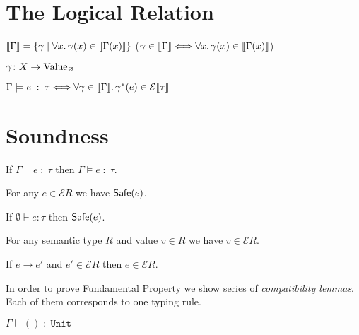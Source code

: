 \section{The Logical Relation}


$\llbracket\Gamma\rrbracket = \{\gamma \mid \forall x\ldotp \gamma(x) \in \llbracket\Gamma(x)\rrbracket\}$
($\gamma \in \llbracket\Gamma\rrbracket \Longleftrightarrow \forall x\ldotp \gamma(x) \in \llbracket\Gamma(x)\rrbracket $)

$\gamma \colon X \to \mathrm{Value}_{\varnothing}$

$\Gamma \models e \;:\; \tau \Longleftrightarrow
  \forall \gamma \in \llbracket\Gamma\rrbracket\ldotp
  \gamma^*(e) \in \mathcal{E}\llbracket\tau\rrbracket$

\section{Soundness}

\begin{theorem}
  If $\Gamma \vdash e \;:\; \tau$ then $\Gamma \models e \;:\; \tau$.
\end{theorem}

\begin{theorem}[Adequacy]
  For any $e \in \mathcal{E}R$ we have $\mathsf{Safe}(e)$.
\end{theorem}

\begin{theorem}
  If $\emptyset \vdash e : \tau$ then $\mathsf{Safe}(e)$.
\end{theorem}

\begin{lemma}\label{lem:lr-val-in-eclo}
  For any semantic type $R$ and value $v \in R$
  we have $v \in \mathcal{E}R$.
\end{lemma}

\begin{lemma}\label{lem:lr-eclo-red}
  If $e \longrightarrow e'$ and $e' \in \mathcal{E}R$ then $e \in \mathcal{E}R$.
\end{lemma}

In order to prove Fundamental Property
we show series of \emph{compatibility lemmas}.
Each of them corresponds to one typing rule.

\begin{lemma}
  $\Gamma \models () \;:\; \mathtt{Unit}$
\end{lemma}

